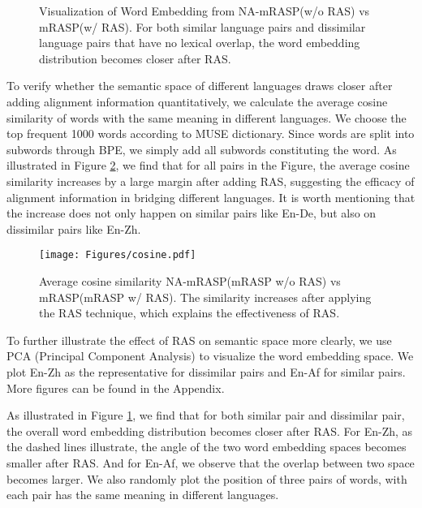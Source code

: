 \documentclass[11pt,a4paper]{article}
\newcommand{\method}{mRASP\xspace}
\begin{document}
\begin{figure}[ht] \centering
{}
\caption{Visualization of Word Embedding from NA-\method (w/o RAS) vs \method (w/ RAS). For both similar language pairs and dissimilar language pairs that have no lexical overlap, the word embedding distribution becomes closer after RAS.}
\label{fig:struct}
\end{figure}



To verify whether the semantic space of different languages draws closer after adding alignment information quantitatively, we calculate the average cosine similarity of words with the same meaning in different languages. We choose the top frequent 1000 words according to MUSE dictionary. Since words are split into subwords through BPE, we simply add all subwords constituting the word.   As illustrated in Figure \ref{fig:cos-sim}, we find that for all pairs in the Figure, the average cosine similarity increases by a large margin after adding RAS, suggesting the efficacy of alignment information in bridging different languages. It is worth mentioning that the increase does not only happen on similar pairs like En-De, but also on dissimilar pairs like En-Zh.


\begin{figure}[ht]
    \centering
    \texttt{[image: Figures/cosine.pdf]}
    \caption{Average cosine similarity NA-\method (\method w/o RAS) vs \method (\method w/ RAS). The similarity increases after applying the RAS technique, which explains the effectiveness of RAS. }
    \label{fig:cos-sim}
\end{figure}


To further illustrate the effect of RAS on semantic space more clearly, we use PCA (Principal Component Analysis)  to visualize the word embedding space. We plot En-Zh as the representative for dissimilar pairs and En-Af for similar pairs. More figures can be found in the Appendix.

As illustrated in Figure \ref{fig:struct}, we find that for both similar pair and dissimilar pair, the overall word embedding distribution becomes closer after RAS. For En-Zh, as the dashed lines illustrate, the angle of the two word embedding spaces becomes smaller after RAS. And for En-Af, we observe that the overlap between two space becomes larger. We also randomly plot the position of three pairs of words, with each pair has the same meaning in different languages. 
\end{document}
